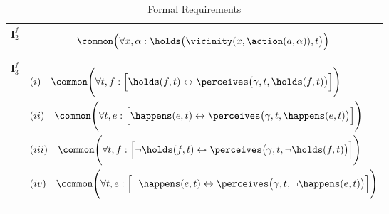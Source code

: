 \begin{table}
\begin{small}
\begin{center}
\begin{tabular}{lp{12cm}}
$\mathbf{I}^f_2$ &         \begin{equation*}
          \common\Big(\forall x, \alpha:  \holds\big(\vicinity(x, \action(a, \alpha)), t\big)\Big)
        \end{equation*}
\\
\midrule

$\mathbf{I}^f_3$ &         \begin{equation*}
          \begin{aligned}
       &  (i) \hspace{10pt}  \common\Bigg(\forall  t, f:  \Big[\holds(f, t) \leftrightarrow \perceives\big(\gamma, t, \holds(f, t)\big) \Big]\Bigg)\\
       & (ii)  \hspace{10pt}   \common\Bigg(\forall  t, e: \Big[\happens(e, t)
            \leftrightarrow \perceives\big(\gamma, t, \happens(e,
            t)\big) \Big]\Bigg)\\
        &   (iii)  \hspace{10pt}   \common\Bigg(\forall  t, f:  \Big[\lnot \holds(f, t)
            \leftrightarrow \perceives\big(\gamma, t, \lnot \holds(f, t)\big) \Big]\Bigg)\\
        &   (iv) \hspace{10pt}    \common\Bigg(\forall  t, e:\Big[\lnot \happens(e, t)
            \leftrightarrow \perceives\big(\gamma, t, \lnot \happens(e, t)\big) \Big]\Bigg)
          \end{aligned}
        \end{equation*}
\\
\bottomrule
\end{tabular}
\caption{Formal Requirements}
\label{formalreqs}
\end{center}
\end{small}
\end{table}